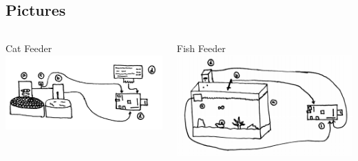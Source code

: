 \documentclass[]{beamer}
\begin{document}
\subsection{Pictures}
\begin{frame}
	\begin{columns}[T]
    	\begin{column}{.5\textwidth}
        	\begin{block}{Cat Feeder}
				\includegraphics[width=\textwidth]{Cat}
            \end{block}
        \end{column}
        
    	\begin{column}{.5\textwidth}
        	\begin{block}{Fish Feeder}
            	\includegraphics[width=\textwidth]{FishTank}
            \end{block}
        \end{column}
    \end{columns}
\end{frame}
\end{document}
